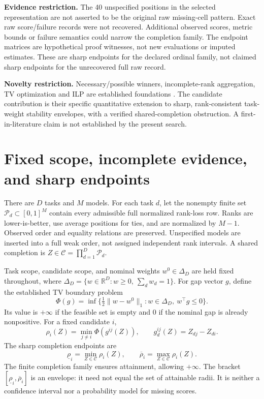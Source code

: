 \documentclass[11pt,a4paper]{article}
\newcommand{\C}{\mathcal C}
\newcommand{\Pset}{\mathcal P}
\newcommand{\R}{\mathbb R}
\newcommand{\rlo}{\underline{\rho}}
\newcommand{\rhi}{\overline{\rho}}
\begin{document}
\textbf{Evidence restriction.} The 40 unspecified positions in the selected
representation are not asserted to be the original raw missing-cell pattern.
Exact raw score/failure records were not recovered. Additional observed scores,
metric bounds or failure semantics could narrow the completion family. The
endpoint matrices are hypothetical proof witnesses, not new evaluations or
imputed estimates. These are sharp endpoints for the declared ordinal family,
not claimed sharp endpoints for the unrecovered full raw record.

\textbf{Novelty restriction.} Necessary/possible winners, incomplete-rank
aggregation, TV optimization and ILP are established foundations
\cite{himmi,xia,chakraborty,tv}. The candidate contribution is their specific
quantitative extension to sharp, rank-consistent task-weight stability envelopes,
with a verified shared-completion obstruction. A first-in-literature claim is
not established by the present search.

\newpage
\section{Fixed scope, incomplete evidence, and sharp endpoints}
There are $D$ tasks and $M$ models. For each task $d$, let the nonempty finite set
$\Pset_d\subset[0,1]^M$ contain every admissible full normalized rank-loss row.
Ranks are lower-is-better, use average positions for ties, and are normalized by
$M-1$. Observed order and equality relations are preserved. Unspecified models
are inserted into a full weak order, not assigned independent rank intervals.
A shared completion is $Z\in\C=\prod_{d=1}^D\Pset_d$.

Task scope, candidate scope, and nominal weights $w^0\in\Delta_D$ are held fixed
throughout, where $\Delta_D=\{w\in\R^D:w\geq0,\ \sum_d w_d=1\}$.
For gap vector $g$, define the established TV boundary problem
\begin{equation}
\Phi(g)=\inf\{\tfrac12\lVert w-w^0\rVert_1:w\in\Delta_D,\ w^\top g\leq0\}.
\end{equation}
Its value is $+\infty$ if the feasible set is empty and $0$ if the nominal gap
is already nonpositive. For a fixed candidate $i$,
\begin{equation}
\rho_i(Z)=\min_{j\ne i}\Phi(g^{ij}(Z)),\qquad
 g_d^{ij}(Z)=Z_{dj}-Z_{di}.
\end{equation}
The sharp completion endpoints are
\begin{equation}
\rlo_i=\min_{Z\in\C}\rho_i(Z),\qquad
\rhi_i=\max_{Z\in\C}\rho_i(Z).
\end{equation}
The finite completion family ensures attainment, allowing $+\infty$. The bracket
$[\rlo_i,\rhi_i]$ is an envelope: it need not equal the set of attainable radii.
It is neither a confidence interval nor a probability model for missing scores.
\end{document}
